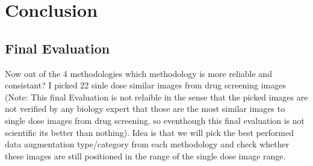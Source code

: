 \chapter{Conclusion}

\section{Final Evaluation}
Now out of the 4 methodologies which methodology is more reliable and consistant?
I picked 22 sinle dose  similar images from drug screening images (Note: This final Evaluation is not relaible in the sense that the picked images are not verified by any biology expert that those are the most similar images to single dose images from drug screening. so eventhough this final evaluation is not scientific its better than nothing). Idea is that we will pick the best performed data augmentation type/category from each methodology and check whether these images are still positioned in the range of the single dose image range.
\begin{table}[H]
	\centering
	\caption{Performance metrics across different ranking strategies.}
	\label{tab:ranking_strategies}
\end{table}


